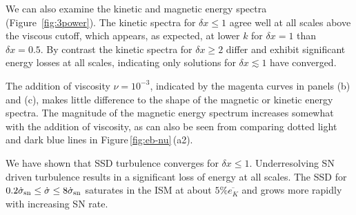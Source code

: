\documentclass[preprint2]{aastex63}
\newcommand\SNr{\dot\sigma_{\rm sn}}
\newcommand\Ms{M_{\rm s}}
\newcommand\dx{ {\delta x}}
\newcommand{\fg}[1]{\textcolor{mypurple}{#1}}
\begin{document}

 We can also examine the
      \fg{kinetic and magnetic}
   energy spectra (Figure~\ref{fig:3power}).
   The kinetic spectra
   for $\dx\leq1$ agree well at 
 all scales above the viscous cutoff, which appears, as expected, at lower $k$ for
 $\dx=1$ than $\dx=0.5$.
 By contrast the kinetic spectra for $\dx\geq2$ differ and exhibit significant
 energy losses at all scales,    
 indicating only solutions for $\dx\lesssim1$ have converged.

 {The addition of viscosity $\nu=10^{-3}$, indicated by the magenta curves in
 panels (b) and (c), {makes little difference to the shape of the
   magnetic or kinetic energy spectra.  The magnitude of the magnetic
   energy spectrum increases somewhat with the addition of viscosity,
   as can also be seen from comparing dotted light and dark blue
   lines in Figure\,\ref{fig:eb-nu}\,(a2).}
   }

 {We have shown that SSD turbulence {converges} for $\dx\leq1$.
 Underresolving SN driven turbulence results in a significant loss of energy
 at all scales. {The}
 SSD for $0.2\SNr\leq \dot\sigma \leq 8\SNr$ saturates in the ISM at about
 $5\%\overline{e_K}$ and grows more rapidly with increasing SN rate.
 } 
\end{document}
